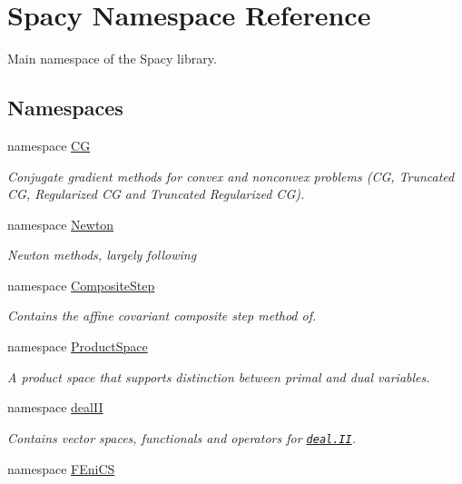 \hypertarget{namespaceSpacy}{\section{\-Spacy \-Namespace \-Reference}
\label{namespaceSpacy}
}


\-Main namespace of the \-Spacy library.  


\subsection*{\-Namespaces}
\begin{DoxyCompactItemize}
\item 
namespace \hyperlink{namespaceSpacy_1_1CG}{\-C\-G}
\begin{DoxyCompactList}\small\item\em \-Conjugate gradient methods for convex and nonconvex problems (\-C\-G, \-Truncated \-C\-G, \-Regularized \-C\-G and \-Truncated \-Regularized \-C\-G). \end{DoxyCompactList}\item 
namespace \hyperlink{namespaceSpacy_1_1Newton}{\-Newton}
\begin{DoxyCompactList}\small\item\em \-Newton methods, largely following \end{DoxyCompactList}\item 
namespace \hyperlink{namespaceSpacy_1_1CompositeStep}{\-Composite\-Step}
\begin{DoxyCompactList}\small\item\em \-Contains the affine covariant composite step method of. \end{DoxyCompactList}\item 
namespace \hyperlink{namespaceSpacy_1_1ProductSpace}{\-Product\-Space}
\begin{DoxyCompactList}\small\item\em \-A product space that supports distinction between primal and dual variables. \end{DoxyCompactList}\item 
namespace \hyperlink{namespaceSpacy_1_1dealII}{deal\-I\-I}
\begin{DoxyCompactList}\small\item\em \-Contains vector spaces, functionals and operators for \href{www.deal.org}{\tt deal.\-I\-I}. \end{DoxyCompactList}\item 
namespace \hyperlink{namespaceSpacy_1_1FEniCS}{\-F\-Eni\-C\-S}

\end{DoxyCompactItemize}
